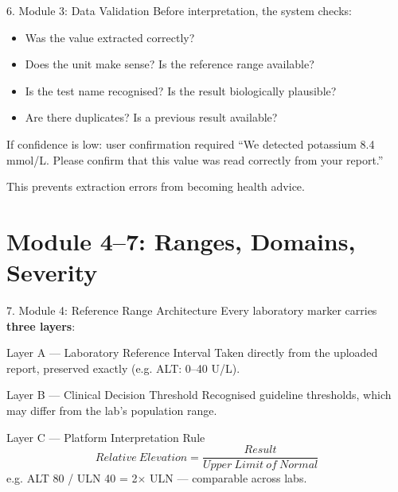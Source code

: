 \documentclass[10pt,aspectratio=169]{beamer}
\begin{document}
\begin{frame}{6. Module 3: Data Validation}
Before interpretation, the system checks:
\begin{itemize}
\item Was the value extracted correctly?
\item Does the unit make sense? Is the reference range available?
\item Is the test name recognised? Is the result biologically plausible?
\item Are there duplicates? Is a previous result available?
\end{itemize}
\vfill
\begin{alertblock}{If confidence is low: user confirmation required}
\footnotesize ``We detected potassium 8.4 mmol/L. Please confirm that this value was read correctly from your report.''
\end{alertblock}
This prevents extraction errors from becoming health advice.
\end{frame}

\section{Module 4--7: Ranges, Domains, Severity}

\begin{frame}{7. Module 4: Reference Range Architecture}
Every laboratory marker carries \textbf{three layers}:
\begin{block}{Layer A --- Laboratory Reference Interval}
Taken directly from the uploaded report, preserved exactly (e.g. ALT: 0--40 U/L).
\end{block}
\begin{block}{Layer B --- Clinical Decision Threshold}
Recognised guideline thresholds, which may differ from the lab's population range.
\end{block}
\begin{block}{Layer C --- Platform Interpretation Rule}
$$Relative\ Elevation = \dfrac{Result}{Upper\ Limit\ of\ Normal}$$
e.g. ALT 80 / ULN 40 = 2$\times$ ULN --- comparable across labs.
\end{block}
\end{frame}
\end{document}
